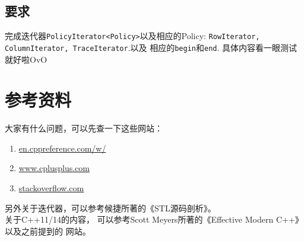 \documentclass[12pt, a4paper]{article}
\newcommand{\ilc}{\texttt}
\begin{document}
\subsection{要求}
  完成迭代器\ilc{PolicyIterator<Policy>}以及相应的Policy:
  \ilc{RowIterator, ColumnIterator, TraceIterator}.以及
  相应的\ilc{begin}和\ilc{end}. 具体内容看一眼测试就好啦OvO


\newpage
\section{参考资料}
  大家有什么问题，可以先查一下这些网站：
  \begin{enumerate}
    \item \url{en.cppreference.com/w/}
    \item \url{www.cplusplus.com}
    \item \url{stackoverflow.com}
  \end{enumerate}
  另外关于迭代器，可以参考候捷所著的《STL源码剖析》。
  \\关于C++11/14的内容，
  可以参考Scott Meyers所著的《Effective Modern C++》以及之前提到的
  网站。
\end{document}
